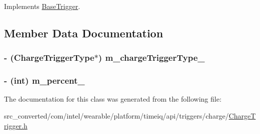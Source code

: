 Implements \hyperlink{interface_base_trigger_a378e9b8ad95bc3fd2ad8b57afe234e62}{Base\+Trigger}.



\subsection{Member Data Documentation}
\hypertarget{interface_charge_trigger_a3c902105d17339d3e2ff5ef6b0d05acb}{}
\subsubsection[{m\+\_\+charge\+Trigger\+Type\+\_\+}]{\setlength{\rightskip}{0pt plus 5cm}-\/ ({\bf Charge\+Trigger\+Type}$\ast$) m\+\_\+charge\+Trigger\+Type\+\_\+}\label{interface_charge_trigger_a3c902105d17339d3e2ff5ef6b0d05acb}
\hypertarget{interface_charge_trigger_a49d25b84a87a04b8be74921c43e146fa}{}
\subsubsection[{m\+\_\+percent\+\_\+}]{\setlength{\rightskip}{0pt plus 5cm}-\/ (int) m\+\_\+percent\+\_\+}\label{interface_charge_trigger_a49d25b84a87a04b8be74921c43e146fa}


The documentation for this class was generated from the following file\+:\begin{DoxyCompactItemize}
\item 
src\+\_\+converted/com/intel/wearable/platform/timeiq/api/triggers/charge/\hyperlink{_charge_trigger_8h}{Charge\+Trigger.\+h}\end{DoxyCompactItemize}
